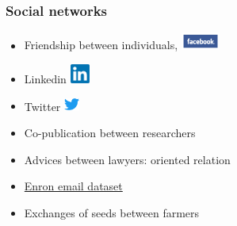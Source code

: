 \documentclass[compress,10pt]{beamer}
\begin{document}
 

\begin{frame} \frametitle{Social networks}
\begin{itemize}
\item Friendship between individuals,  \includegraphics[width=0.1\textwidth]{plots/facebook.png} 
\item Linkedin \includegraphics[width=0.05\textwidth]{plots/linkedIn.png} 
\item Twitter \includegraphics[width=0.5cm]{plots/twitter.png}

\item Co-publication between researchers   
\item Advices between lawyers: \alert{oriented relation}
\item \href{https://www.cs.cmu.edu/~./enron/}{Enron email dataset}
\item Exchanges of seeds between farmers  
\end{itemize}


\end{frame}
\end{document}
